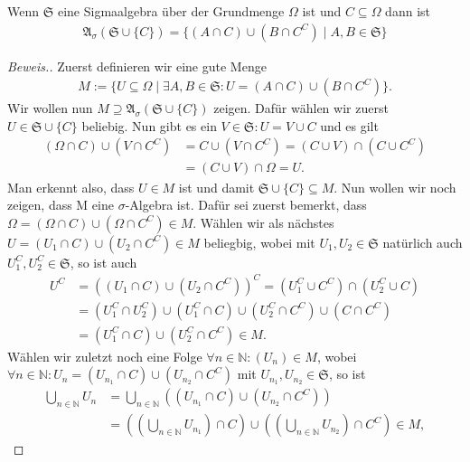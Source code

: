\begin{lemma}
    Wenn $\mathfrak{S}$ eine Sigmaalgebra über der Grundmenge $\Omega$ ist und $C \subseteq \Omega$ dann ist
    \begin{align*}
        \mathfrak{A}_\sigma(\mathfrak{S} \cup \{C\})=\{(A\cap C)\cup(B \cap C^C)\mid A,B \in \mathfrak{S}\}
    \end{align*}
\end{lemma}

\begin{proof}[Beweis.]
    Zuerst definieren wir eine gute Menge 
    \begin{align*}
        M:=\{U \subseteq \Omega\mid \exists A,B \in \mathfrak{S}: U = (A\cap C)\cup (B\cap C^C)\}.
    \end{align*}
    Wir wollen nun $M \supseteq \mathfrak{A}_\sigma(\mathfrak{S}\cup \{C\})$ zeigen. Dafür wählen wir zuerst $U\in \mathfrak{S}\cup\{C\}$ beliebig. Nun gibt es ein $V\in \mathfrak{S}:U=V\cup C$ und es gilt
    \begin{align*}
        (\Omega\cap C)\cup(V\cap C^C)&=C\cup(V\cap C^C) = (C\cup V)\cap(C\cup C^C)\\
        &=(C\cup V)\cap\Omega = U.
    \end{align*}
    Man erkennt also, dass $U\in M$ ist und damit $\mathfrak{S}\cup\{C\}\subseteq M$. Nun wollen wir noch zeigen, dass M eine $\sigma$-Algebra ist. Dafür sei zuerst bemerkt, dass $\Omega=(\Omega\cap C)\cup(\Omega\cap C^C)\in M$. Wählen wir als nächstes $U=(U_1\cap C)\cup(U_2\cap C^C)\in M$ beliegbig, wobei mit $U_1,U_2\in\mathfrak{S}$ natürlich auch $U_1^C,U_2^C\in\mathfrak{S}$, so ist auch
    \begin{align*}
        U^C&=((U_1\cap C)\cup(U_2\cap C^C))^C=(U_1^C\cup C^C)\cap(U_2^C\cup C)\\
        &=(U_1^C\cap U_2^C)\cup(U_1^C\cap C)\cup(U_2^C\cap C^C)\cup(C\cap C^C)\\
        &=(U_1^C\cap C)\cup(U_2^C\cap C^C)\in M.
    \end{align*}
    Wählen wir zuletzt noch eine Folge $\forall n\in\mathbb{N}:(U_n)\in M$, wobei $\forall n\in\mathbb{N}:U_n=(U_{n_1}\cap C)\cup(U_{n_2}\cap C^C)$ mit $U_{n_1},U_{n_2}\in\mathfrak{S}$, so ist
    \begin{align*}
        \bigcup_{n\in\mathbb{N}}U_n&=\bigcup_{n\in\mathbb{N}}((U_{n_1}\cap C)\cup(U_{n_2}\cap C^C))\\
        &= \left(\left(\bigcup_{n\in\mathbb{N}}U_{n_1}\right)\cap C\right)\cup\left(\left(\bigcup_{n\in\mathbb{N}}U_{n_2}\right)\cap C^C\right)\in M,

\end{align*}
\end{proof}
